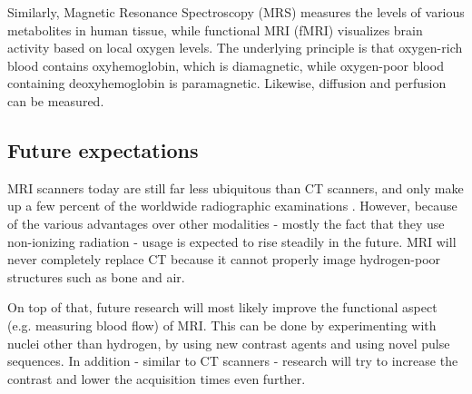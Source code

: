 
Similarly, Magnetic Resonance Spectroscopy (MRS) measures the levels of various
metabolites in human tissue, while functional MRI (fMRI) visualizes brain
activity based on local oxygen levels. The underlying principle is that
oxygen-rich blood contains oxyhemoglobin, which is diamagnetic, while
oxygen-poor blood containing deoxyhemoglobin is paramagnetic. Likewise,
diffusion and perfusion can be measured.

\subsection{Future expectations}\label{ssec:mrifuture}
MRI scanners today are still far less ubiquitous than CT scanners, and only make
up a few percent of the worldwide radiographic examinations \cite{oecdhealth}.
However, because of the various advantages over other modalities - mostly the
fact that they use non-ionizing radiation - usage is expected to rise steadily
in the future. MRI will never completely replace CT because it cannot properly
image hydrogen-poor structures such as bone and air.

On top of that, future research will most likely improve the functional aspect
(e.g. measuring blood flow) of MRI. This can be done by experimenting with
nuclei other than hydrogen, by using new contrast agents and using novel pulse
sequences. In addition - similar to CT scanners - research will try to increase
the contrast and lower the acquisition times even further.